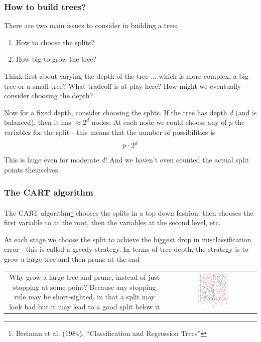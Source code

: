 \documentclass[mathserif]{beamer}
\def\red{\color[rgb]{0.8,0,0}}
\begin{document}
\begin{frame}
\frametitle{How to build trees?}

\smallskip
There are two main issues to consider in building a tree:
\begin{enumerate}
\item How to choose the splits?
\item How big to grow the tree?
\end{enumerate}

\bigskip
Think first about varying the depth of the tree ... which is more complex,
a big tree or a small tree? What {\red tradeoff} is at play here? 
How might we eventually consider choosing the depth?

\bigskip
Now for a fixed depth, consider choosing the splits. If the tree has 
depth $d$ (and is balanced), then it has $\approx 2^d$ nodes. At each node
we could choose any of $p$ the variables for the split---this means 
that the number of possibilities is
\vspace{-3pt}
$$p \cdot 2^d
\vspace{-3pt}$$
This is {\red huge} even for moderate $d$! And we haven't even
counted the actual split points themselves
\end{frame}

\begin{frame}
\frametitle{The CART algorithm}
\smallskip
The {\red CART algorithm}\footnote{Breiman et al. (1984), ``Classification
and Regression Trees''} 
chooses the splits in a top down fashion: then chooses the first variable 
to at the root, then the variables at the second level, etc. 

\bigskip
At each stage we choose the split to achieve the biggest
drop in misclassification error---this is called a {\red greedy} strategy.
In terms of tree depth, the strategy is to grow a large tree and then {\red prune} 
at the end

\smallskip
\smallskip
\begin{tabular}{cc}
\parbox{0.5\textwidth}{
Why grow a large tree and prune, instead of just stopping at some point?
Because any stopping rule may be {\red short-sighted}, in that a split
may look bad but it may lead to a good split below it} &
\parbox{0.4\textwidth}{
\includegraphics[width=0.4\textwidth]{stop.pdf}}
\end{tabular}
\end{frame}
\end{document}
